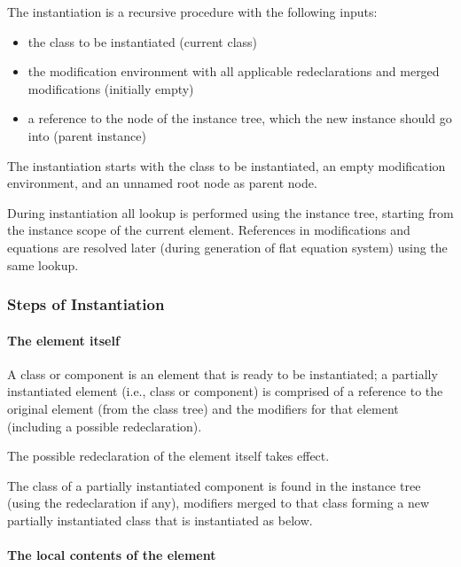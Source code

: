 The instantiation is a recursive procedure with the following inputs:
\begin{itemize}
\item
  the class to be instantiated (current class)
\item
  the modification environment with all applicable redeclarations and merged modifications (initially empty)
\item
  a reference to the node of the instance tree, which the new instance should go into (parent instance)
\end{itemize}

The instantiation starts with the class to be instantiated, an empty modification environment, and an unnamed root node as parent node.

During instantiation all lookup is performed using the instance tree, starting from the instance scope of the current element.
References in modifications and equations are resolved later (during generation of flat equation system) using the same lookup.


\subsubsection{Steps of Instantiation}\label{steps-of-instantiation}

\paragraph*{The element itself}\label{the-element-itself}

A  class or component is an element that is ready to be instantiated; a partially instantiated element (i.e., class or component) is comprised of a reference to the original element (from the class tree) and the modifiers for that element (including a possible redeclaration).

The possible redeclaration of the element itself takes effect.

The class of a partially instantiated component is found in the instance tree (using the redeclaration if any), modifiers merged to that class forming a new partially instantiated class that is instantiated as below.

\paragraph*{The local contents of the element}\label{the-local-contents-of-the-element}

